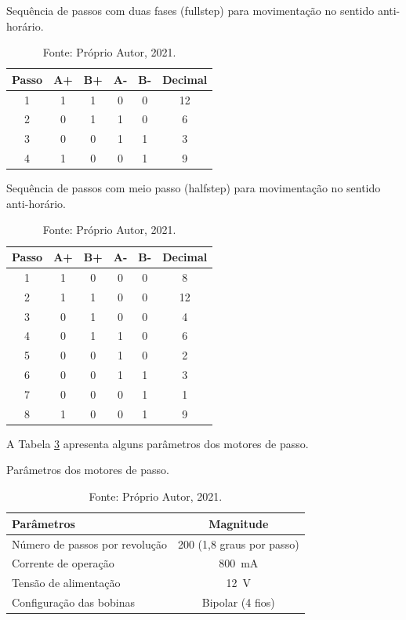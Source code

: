 \begin{table}[H]
    \centering
    \caption{Sequência de passos com duas fases (fullstep) para movimentação no sentido anti-horário.}
    \begin{tabular}{cccccc}
        \hline
        \textbf{Passo} & \textbf{A+} & \textbf{B+} & \textbf{A-} & \textbf{B-} & \textbf{Decimal}\\
        \hline
        1 & 1 & 1 & 0 & 0 & 12\\
        2 & 0 & 1 & 1 & 0 & 6\\
        3 & 0 & 0 & 1 & 1 & 3\\
        4 & 1 & 0 & 0 & 1 & 9\\
        \hline       
    \end{tabular}
    \caption*{Fonte: Próprio Autor, 2021.}
    \label{tab:fullstepantihorario}
\end{table}

\begin{table}[H]
    \centering
    \caption{Sequência de passos com meio passo (halfstep) para movimentação no sentido anti-horário.}
    \begin{tabular}{cccccc}
        \hline
        \textbf{Passo} & \textbf{A+} & \textbf{B+} & \textbf{A-} & \textbf{B-} & \textbf{Decimal}\\
        \hline
        1 & 1 & 0 & 0 & 0 & 8\\
        2 & 1 & 1 & 0 & 0 & 12\\
        3 & 0 & 1 & 0 & 0 & 4\\
        4 & 0 & 1 & 1 & 0 & 6\\
        5 & 0 & 0 & 1 & 0 & 2\\
        6 & 0 & 0 & 1 & 1 & 3\\
        7 & 0 & 0 & 0 & 1 & 1\\
        8 & 1 & 0 & 0 & 1 & 9\\
        \hline       
    \end{tabular}
    \caption*{Fonte: Próprio Autor, 2021.}
    \label{tab:halfstepantihorario}
\end{table}

A Tabela \ref{tab:pmotordepasso} apresenta alguns parâmetros dos motores de passo.

\begin{table}[H]
    \centering
    \caption{Parâmetros dos motores de passo.}
    \begin{tabular}{lc}
        \hline
        \textbf{Parâmetros} & \textbf{Magnitude}\\
        \hline
        Número de passos por revolução & 200 (1,8 graus por passo)\\
        Corrente de operação & 800~mA\\
        Tensão de alimentação & 12~V\\
        Configuração das bobinas & Bipolar (4 fios)\\
        \hline       
    \end{tabular}
    \caption*{Fonte: Próprio Autor, 2021.}
    \label{tab:pmotordepasso}
\end{table}


